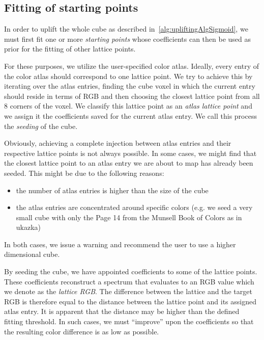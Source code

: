 \subsection{Fitting of starting points}

In order to uplift the whole cube as described in~\cref{alg:upliftingAlgSigmoid}, we must first fit one or more \emph{starting points} whose coefficients can then be used as prior for the fitting of other lattice points.

For these purposes, we utilize the user-specified color atlas. Ideally, every entry of the color atlas should correspond to one lattice point. We try to achieve this by iterating over the atlas entries, finding the cube voxel in which the current entry should reside in terms of RGB and then choosing the closest lattice point from all 8 corners of the voxel. We classify this lattice point as an \emph{atlas lattice point} and we assign it the coefficients saved for the current atlas entry. We call this process the \emph{seeding} of the cube.

Obviously, achieving a complete injection between atlas entries and their respective lattice points is not always possible. In some cases, we might find that the closest lattice point to an atlas entry we are about to map has already been seeded. This might be due to the following reasons:
\begin{itemize}
	\item the number of atlas entries is higher than the size of the cube
	\item the atlas entries are concentrated around specific colors (e.g. we seed a very small cube with only the Page 14 from the Munsell Book of Colors as in ukazka)
\end{itemize}
In both cases, we issue a warning and recommend the user to use a higher dimensional cube.

By seeding the cube, we have appointed coefficients to some of the lattice points. These coefficients reconstruct a spectrum that evaluates to an RGB value which we denote as the \emph{lattice RGB}. The difference between the lattice and the target RGB is therefore equal to the distance between the lattice point and its assigned atlas entry. It is apparent that the distance may be higher than the defined fitting threshold. In such cases, we must ``improve'' upon the coefficients so that the resulting color difference is as low as possible.

